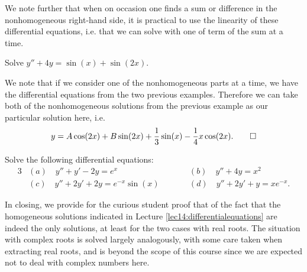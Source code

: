 \noindent
We note further that when on occasion one finds a sum or difference in the nonhomogeneous right-hand side, it is practical to use the linearity of these differential equations, i.e. that we can solve with one of term of the sum at a time.

\begin{example}
	Solve $y'' + 4 y = \sin(x) + \sin(2 x)$.

	We note that if we consider one of the nonhomogeneous parts at a time, we have the differential equations from the two previous examples.
	Therefore we can take both of the nonhomogeneous solutions from the previous example as our particular solution here, i.e.
	\[
		y = A \cos(2 x) + B \sin(2 x) + \frac{1}{3} \sin(x) - \frac{1}{4} x \cos(2 x). \qedhere
	\]
\end{example}

\begin{exercise}
	Solve the following differential equations:
	\begin{alignat*}{3}
		&(a) \quad y'' + y' - 2 y = e^x \qquad &&(b) \quad y'' + 4 y = x^2 \\
		&(c) \quad y'' + 2 y' + 2 y = e^{-x} \sin(x) \qquad &&(d) \quad y'' + 2 y' + y = x e^{-x}.
	\end{alignat*}
\end{exercise}

\noindent
In closing, we provide for the curious student proof that of the fact that the homogeneous solutions indicated in Lecture \ref{lec14:differentialequations} are indeed the only solutions, at least for the two cases with real roots.
The situation with complex roots is solved largely analogously, with some care taken when extracting real roots, and is beyond the scope of this course since we are expected not to deal with complex numbers here.

